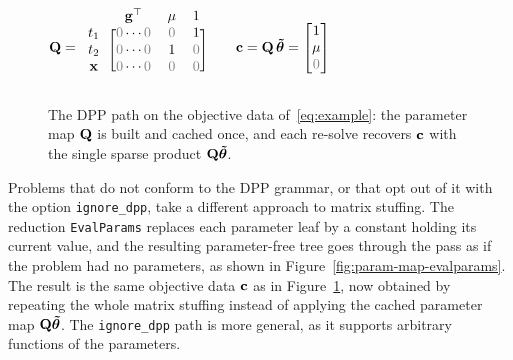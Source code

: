 \begin{figure}[htbp]
\centering
$
\mmat{Q} =
\begin{blockarray}{cccc}
        & \mvec{g}^\top & \mu & 1 \\
\begin{block}{c[ccc]}
  t_1   & \plotzero \cdots \plotzero & \plotzero & 1         \\
  t_2   & \plotzero \cdots \plotzero & 1         & \plotzero \\
  \mvec{x}     & \plotzero \cdots \plotzero & \plotzero & \plotzero \\
\end{block}
\end{blockarray}
\qquad
\mvec{c} = \mmat{Q}\,\gvec{\tilde\theta}
= \begin{bmatrix}1\\ \mu\\ \plotzero\end{bmatrix}
$
\caption{The DPP path on the objective data of~\eqref{eq:example}: the parameter map
$\mathbf{Q}$
is built and cached once, and each re-solve recovers $\mathbf{c}$ with the single sparse
product
$\mathbf{Q}\bm{\tilde\theta}$.}
\label{fig:param-map-dpp}
\end{figure}

Problems that do not conform to the DPP grammar, or that opt out of it with the option
\texttt{ignore\_dpp}, take a different approach to matrix stuffing.
The reduction \texttt{EvalParams} replaces each
parameter leaf by a constant holding its current value, and the resulting parameter-free tree
goes through the pass as if the problem had no parameters, as shown in
Figure~\ref{fig:param-map-evalparams}. The result is the same objective data $\mathbf{c}$ as in
Figure~\ref{fig:param-map-dpp}, now obtained by repeating the whole matrix stuffing instead
of applying the cached parameter map $\mathbf{Q}\bm{\tilde\theta}$. The \texttt{ignore\_dpp} path is
more general, as it supports arbitrary functions of the parameters.

